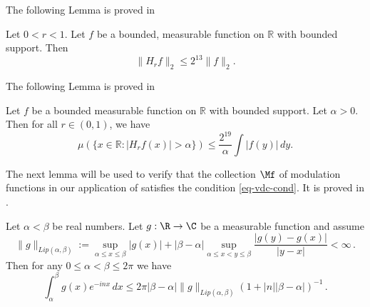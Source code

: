 The following Lemma is proved in 


\begin{lemma}
    \label{Hilbert-strong-2-2}
    Let $0<r<1$. Let $f$ be a bounded, measurable function on $\mathbb{R}$ with bounded support. Then
    \begin{equation}
        \label{eq-Hr-L2-bound}
        \|H_rf\|_{2}\leq 2^{13} \|f\|_2.
    \end{equation}
\end{lemma}

The following Lemma is proved in 

\begin{lemma}
    \label{Hilbert-weak-1-1}
    Let $f$ be a bounded measurable function on $\mathbb{R}$ with bounded support. Let $\alpha>0$. Then for all $r\in (0, 1)$, we have
    \begin{equation}
        \label{eq-weak-1-1}
        \mu\left(\{x\in \mathbb{R}: |H_r f(x)|>\alpha\}\right)\leq \frac{2^{19}}{\alpha} \int |f(y)|\, dy.
    \end{equation}
\end{lemma}

The next lemma will be used to verify that the collection $\Mf$ of modulation functions in our application of  satisfies the condition \eqref{eq-vdc-cond}.
It is proved in .

\begin{lemma}
\label{van-der-Corput}
    Let $\alpha<\beta$ be real numbers. Let $g:\R\to \C$ be a measurable function and assume
    \begin{equation}
        \|g\|_{Lip(\alpha,\beta)}:=\sup_{\alpha\le x\le \beta}|g(x)|+|\beta-\alpha|
        \sup_{\alpha\le x<y\le \beta} \frac {|g(y)-g(x)|}{|y-x|}<\infty\, .
    \end{equation}
    Then for any $0\le \alpha<\beta\le 2\pi$ we have
    \begin{equation}
        \int _{\alpha}^{\beta} g(x) e^{-inx}\, dx\le 2\pi |\beta-\alpha|\|g\|_{Lip(\alpha,\beta)}(1+|n||\beta-\alpha|)^{-1}\, .
    \end{equation}

\end{lemma}


